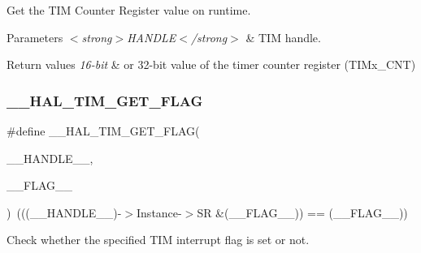 Get the T\+IM Counter Register value on runtime. 


\begin{DoxyParams}{Parameters}
{\em $<$strong$>$\+H\+A\+N\+D\+L\+E$<$/strong$>$} & T\+IM handle. \\
\hline
\end{DoxyParams}

\begin{DoxyRetVals}{Return values}
{\em 16-\/bit} & or 32-\/bit value of the timer counter register (T\+I\+Mx\+\_\+\+C\+NT) \\
\hline
\end{DoxyRetVals}
\mbox{\label{group___t_i_m___exported___macros_ga96d98c66ad9d85f00c148de99888ef19}} 
\subsubsection{\texorpdfstring{\+\_\+\+\_\+\+H\+A\+L\+\_\+\+T\+I\+M\+\_\+\+G\+E\+T\+\_\+\+F\+L\+AG}{\_\_HAL\_TIM\_GET\_FLAG}}
{\footnotesize\ttfamily \#define \+\_\+\+\_\+\+H\+A\+L\+\_\+\+T\+I\+M\+\_\+\+G\+E\+T\+\_\+\+F\+L\+AG(\begin{DoxyParamCaption}\item[{}]{\+\_\+\+\_\+\+H\+A\+N\+D\+L\+E\+\_\+\+\_\+,  }\item[{}]{\+\_\+\+\_\+\+F\+L\+A\+G\+\_\+\+\_\+ }\end{DoxyParamCaption})~(((\+\_\+\+\_\+\+H\+A\+N\+D\+L\+E\+\_\+\+\_\+)-\/$>$Instance-\/$>$SR \&(\+\_\+\+\_\+\+F\+L\+A\+G\+\_\+\+\_\+)) == (\+\_\+\+\_\+\+F\+L\+A\+G\+\_\+\+\_\+))}



Check whether the specified T\+IM interrupt flag is set or not. 


